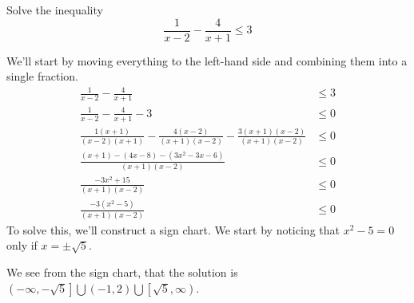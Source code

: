 \documentclass{ximera}
\begin{document}
\begin{example}
	Solve the inequality
	\[ \frac{1}{x-2} - \frac{4}{x+1} \leq 3 \]
	\begin{explanation}
		We'll start by moving everything to the left-hand side and combining them into a single fraction.
		\begin{align*}
			\frac{1}{x-2} - \frac{4}{x+1} &\leq 3 \\
			\frac{1}{x-2} - \frac{4}{x+1} - 3 &\leq 0\\
			\frac{1(x+1)}{(x-2)(x+1)} - \frac{4(x-2)}{(x+1)(x-2)} - \frac{3(x+1)(x-2)}{(x+1)(x-2)} &\leq 0\\
			\frac{(x+1) - (4x-8) - (3x^2-3x-6)}{(x+1)(x-2)} &\leq 0\\
			\frac{-3x^2+15}{(x+1)(x-2)} &\leq 0\\
			\frac{-3(x^2-5)}{(x+1)(x-2)} &\leq 0
		\end{align*}
		To solve this, we'll construct a sign chart.  We start by noticing that $x^2-5 =0$ only if $x = \pm \sqrt{5}$.
		
		We see from the sign chart, that the solution is $\displaystyle \left( -\infty, -\sqrt{5} \right] \bigcup \left(-1, 2\right) \bigcup \left[ \sqrt{5}, \infty \right)$.
	\end{explanation}
\end{example}
\end{document}
